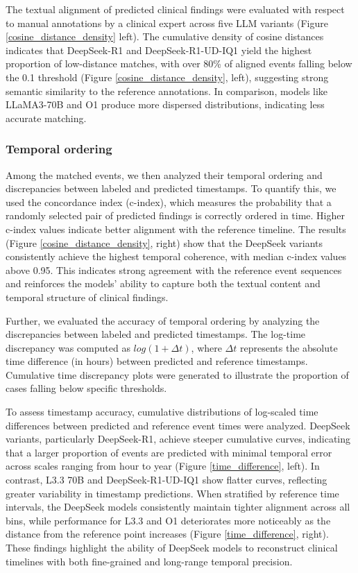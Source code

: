 \documentclass[pmlr]{jmlr}%
\begin{document}
The textual alignment of predicted clinical findings were evaluated with respect to manual annotations by a clinical expert across five LLM variants (Figure \ref{cosine_distance_density} left). The cumulative density of cosine distances indicates that DeepSeek-R1 and DeepSeek-R1-UD-IQ1 yield the highest proportion of low-distance matches, with over 80\% of aligned events falling below the 0.1 threshold (Figure \ref{cosine_distance_density}, left), suggesting strong semantic similarity to the reference annotations. In comparison, models like LLaMA3-70B and O1 produce more dispersed distributions, indicating less accurate matching. 

\subsubsection{Temporal ordering}

Among the matched events, we then analyzed their temporal ordering and discrepancies between labeled and predicted timestamps. To quantify this, we used the concordance index (c-index), which measures the probability that a randomly selected pair of predicted findings is correctly ordered in time. Higher c-index values indicate better alignment with the reference timeline. The results (Figure \ref{cosine_distance_density}, right) show that the DeepSeek variants consistently achieve the highest temporal coherence, with median c-index values above 0.95. This indicates strong agreement with the reference event sequences and reinforces the models’ ability to capture both the textual content and temporal structure of clinical findings.

Further, we evaluated the accuracy of temporal ordering by analyzing the discrepancies between labeled and predicted timestamps. The log-time discrepancy was computed as $log(1 + \Delta t)$, where $\Delta t$  represents the absolute time difference (in hours) between predicted and reference timestamps. Cumulative time discrepancy plots were generated to illustrate the proportion of cases falling below specific thresholds.

To assess timestamp accuracy, cumulative distributions of log-scaled time differences between predicted and reference event times were analyzed. DeepSeek variants, particularly DeepSeek-R1, achieve steeper cumulative curves, indicating that a larger proportion of events are predicted with minimal temporal error across scales ranging from hour to year (Figure \ref{time_difference}, left). In contrast, L3.3 70B and DeepSeek-R1-UD-IQ1 show flatter curves, reflecting greater variability in timestamp predictions. When stratified by reference time intervals, the DeepSeek models consistently maintain tighter alignment across all bins, while performance for L3.3 and O1 deteriorates more noticeably as the distance from the reference point increases (Figure \ref{time_difference}, right). These findings highlight the ability of DeepSeek models to reconstruct clinical timelines with both fine-grained and long-range temporal precision.
\end{document}
